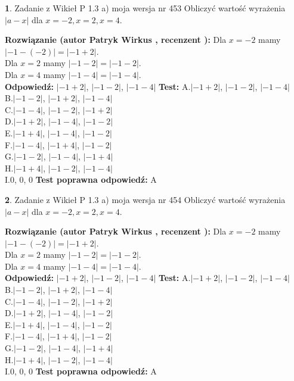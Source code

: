 \documentclass[12pt, a4paper]{article}
\theoremstyle{definition} %
\newtheorem{zad}{}
\newcommand{\zadStart}[1]{\begin{zad}#1\newline}
\newcommand{\zadStop}{\end{zad}}
\newcommand{\rozwStart}[2]{\noindent \textbf{Rozwiązanie (autor #1 , recenzent #2): }\newline}
\newcommand{\rozwStop}{\newline}
\newcommand{\odpStart}{\noindent \textbf{Odpowiedź:}\newline}
\newcommand{\odpStop}{\newline}
\newcommand{\testStart}{\noindent \textbf{Test:}\newline}
\newcommand{\testStop}{\newline}
\newcommand{\kluczStart}{\noindent \textbf{Test poprawna odpowiedź:}\newline}
\newcommand{\kluczStop}{\newline}
\begin{document}
\zadStart{Zadanie z Wikieł P 1.3 a) moja wersja nr 453}
Obliczyć wartość wyrażenia $|a - x|$ dla $x=-2,x=2,x=4$.
\zadStop
\rozwStart{Patryk Wirkus}{}
Dla $x = -2$ mamy $|-1 - (-2)| = |-1 + 2|$.\\
Dla $x = 2$ mamy $|-1 - 2| = |-1 - 2|$.\\
Dla $x = 4$ mamy $|-1 - 4| = |-1 - 4|$.\\
\rozwStop
\odpStart
$|-1 + 2|$, $|-1 - 2|$, $|-1 - 4|$
\odpStop
\testStart
A.$|-1 + 2|$, $|-1 - 2|$, $|-1 - 4|$\\
B.$|-1 - 2|$, $|-1 + 2|$, $|-1 - 4|$\\
C.$|-1 - 4|$, $|-1 - 2|$, $|-1 + 2|$\\
D.$|-1 + 2|$, $|-1 - 4|$, $|-1 - 2|$\\
E.$|-1 + 4|$, $|-1 - 4|$, $|-1 - 2|$\\
F.$|-1 - 4|$, $|-1 + 4|$, $|-1 - 2|$\\
G.$|-1 - 2|$, $|-1 - 4|$, $|-1 + 4|$\\
H.$|-1 + 4|$, $|-1 - 2|$, $|-1 - 4|$\\
I.$0$, $0$, $0$
\testStop
\kluczStart
A
\kluczStop



\zadStart{Zadanie z Wikieł P 1.3 a) moja wersja nr 454}
Obliczyć wartość wyrażenia $|a - x|$ dla $x=-2,x=2,x=4$.
\zadStop
\rozwStart{Patryk Wirkus}{}
Dla $x = -2$ mamy $|-1 - (-2)| = |-1 + 2|$.\\
Dla $x = 2$ mamy $|-1 - 2| = |-1 - 2|$.\\
Dla $x = 4$ mamy $|-1 - 4| = |-1 - 4|$.\\
\rozwStop
\odpStart
$|-1 + 2|$, $|-1 - 2|$, $|-1 - 4|$
\odpStop
\testStart
A.$|-1 + 2|$, $|-1 - 2|$, $|-1 - 4|$\\
B.$|-1 - 2|$, $|-1 + 2|$, $|-1 - 4|$\\
C.$|-1 - 4|$, $|-1 - 2|$, $|-1 + 2|$\\
D.$|-1 + 2|$, $|-1 - 4|$, $|-1 - 2|$\\
E.$|-1 + 4|$, $|-1 - 4|$, $|-1 - 2|$\\
F.$|-1 - 4|$, $|-1 + 4|$, $|-1 - 2|$\\
G.$|-1 - 2|$, $|-1 - 4|$, $|-1 + 4|$\\
H.$|-1 + 4|$, $|-1 - 2|$, $|-1 - 4|$\\
I.$0$, $0$, $0$
\testStop
\kluczStart
A
\kluczStop
\end{document}
